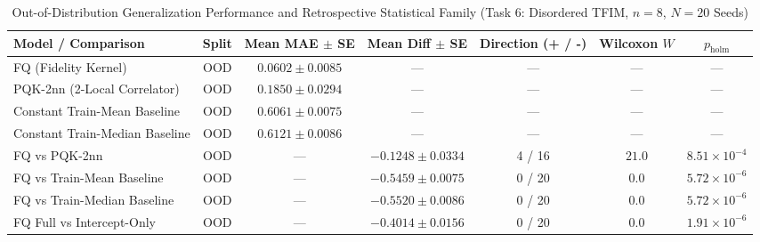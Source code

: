\begin{table}[t]
\centering
\caption{Out-of-Distribution Generalization Performance and Retrospective Statistical Family (Task 6: Disordered TFIM, $n=8$, $N=20$ Seeds)}
\label{tab:t6_ood_stats}
\begin{tabular}{lcccccc}
\toprule
Model / Comparison & Split & Mean MAE $\pm$ SE & Mean Diff $\pm$ SE & Direction (+ / -) & Wilcoxon $W$ & $p_{\mathrm{holm}}$ \\
\midrule
FQ (Fidelity Kernel) & OOD & $0.0602 \pm 0.0085$ & --- & --- & --- & --- \\
PQK-2nn (2-Local Correlator) & OOD & $0.1850 \pm 0.0294$ & --- & --- & --- & --- \\
Constant Train-Mean Baseline & OOD & $0.6061 \pm 0.0075$ & --- & --- & --- & --- \\
Constant Train-Median Baseline & OOD & $0.6121 \pm 0.0086$ & --- & --- & --- & --- \\
\midrule
FQ vs PQK-2nn & OOD & --- & $-0.1248 \pm 0.0334$ & 4 / 16 & $21.0$ & $8.51 \times 10^{-4}$ \\
FQ vs Train-Mean Baseline & OOD & --- & $-0.5459 \pm 0.0075$ & 0 / 20 & $0.0$ & $5.72 \times 10^{-6}$ \\
FQ vs Train-Median Baseline & OOD & --- & $-0.5520 \pm 0.0086$ & 0 / 20 & $0.0$ & $5.72 \times 10^{-6}$ \\
\midrule
FQ Full vs Intercept-Only & OOD & --- & $-0.4014 \pm 0.0156$ & 0 / 20 & $0.0$ & $1.91 \times 10^{-6}$ \\
\bottomrule
\end{tabular}
\end{table}
